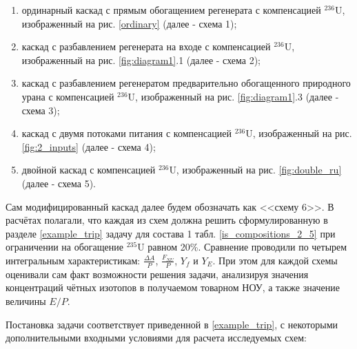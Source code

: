 \begin{enumerate}
    \item ординарный каскад с прямым обогащением регенерата с компенсацией $^{236}$U, изображенный на рис. \ref{ordinary} (далее - схема 1);
    \item каскад с разбавлением регенерата на входе с компенсацией $^{236}$U, изображенный на рис. \ref{fig:diagram1}.1 (далее - схема 2);
    \item каскад с разбавлением регенератом предварительно обогащенного природного урана с компенсацией $^{236}$U, изображенный на рис. \ref{fig:diagram1}.3 (далее - схема 3);
    \item каскад с двумя потоками питания с компенсацией $^{236}$U, изображенный на рис. \ref{fig:2_inputs} (далее - схема 4);
    \item двойной каскад с компенсацией $^{236}$U, изображенный на рис. \ref{fig:double_ru} (далее - схема 5).
\end{enumerate}

Сам модифицированный каскад далее будем обозначать как <<схему 6>>. В расчётах полагали, что каждая из схем должна решить сформулированную в разделе \ref{example_trip} задачу для состава 1 табл. \ref{is_compositions_2_5} при ограничении на обогащение $^{235}$U равном 20\%. Сравнение проводили по четырем интегральным характеристикам: $\frac{\Delta A}{P}$, $\frac{F_{NU}}{P}$, $Y_f$ и $Y_E$. При этом для каждой схемы оценивали сам факт возможности решения задачи, анализируя значения концентраций чётных изотопов в получаемом товарном НОУ, а также значение величины $E/P$. 

Постановка задачи соответствует приведенной в \ref{example_trip}, с некоторыми дополнительными входными условиями для расчета исследуемых схем:

